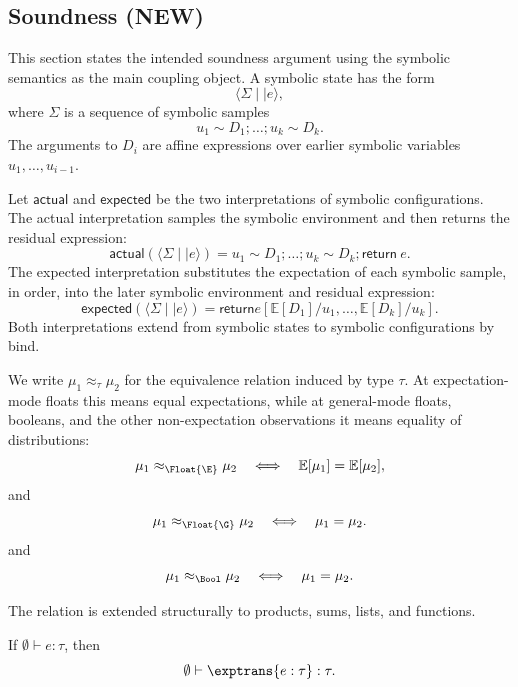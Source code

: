 







\subsection{Soundness (NEW)}

This section states the intended soundness argument using the symbolic
semantics as the main coupling object.  A symbolic state has the form
\[
  \langle \Sigma \mid\mid e \rangle,
\]
where $\Sigma$ is a sequence of symbolic samples
\[
  u_1 \sim D_1;\ldots;u_k \sim D_k.
\]
The arguments to $D_i$ are affine expressions over earlier symbolic variables
$u_1,\ldots,u_{i-1}$.

Let $\mathsf{actual}$ and $\mathsf{expected}$ be the two interpretations of
symbolic configurations.  The actual interpretation samples the symbolic
environment and then returns the residual expression:
\[
  \mathsf{actual}(\langle \Sigma \mid\mid e \rangle)
  =
  u_1 \sim D_1;\ldots;u_k \sim D_k;\mathsf{return}\ e.
\]
The expected interpretation substitutes the expectation of each symbolic
sample, in order, into the later symbolic environment and residual expression:
\[
  \mathsf{expected}(\langle \Sigma \mid\mid e \rangle)
  =
  \mathsf{return}
  e[
    \mathbb{E}[D_1]/u_1,\ldots,
    \mathbb{E}[D_k]/u_k
  ].
\]
Both interpretations extend from symbolic states to symbolic configurations by
bind.

\begin{definition}
  We write $\mu_1 \approx_\tau \mu_2$ for the equivalence relation induced by
  type $\tau$.  At expectation-mode floats this means equal expectations,
  while at general-mode floats, booleans, and the other non-expectation
  observations it means equality of distributions:
  \[
    \mu_1 \approx_{\Float{\E}} \mu_2
    \quad\Longleftrightarrow\quad
    \mathbb{E}[\mu_1] = \mathbb{E}[\mu_2],
  \]
  and
  \[
    \mu_1 \approx_{\Float{\G}} \mu_2
    \quad\Longleftrightarrow\quad
    \mu_1 = \mu_2.
  \]
  and
  \[ 
    \mu_1 \approx_{\Bool} \mu_2
    \quad\Longleftrightarrow\quad
    \mu_1 = \mu_2.
  \]

  The relation is extended structurally to products, sums, lists, and
  functions.
\end{definition}

\begin{lemma}
  If $\emptyset \vdash e : \tau$, then
  \[
    \emptyset \vdash \exptrans{e : \tau} : \tau.
  \]
\end{lemma}


